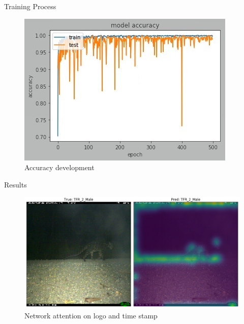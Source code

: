 \documentclass[10pt]{beamer}
\begin{document}
\begin{frame}{Training Process}
	\centering
	\begin{figure}
		\includegraphics[width=.9\columnwidth,height=\textheight,keepaspectratio]{images/Pretrain_acc_ResNet50_cropped_heavy_augment_lr0_0001.jpg}
		\caption{Accuracy development}
	\end{figure}
\end{frame}



\begin{frame}{Results}
	\begin{figure}
		\includegraphics[width=\columnwidth]{images/Attention_Leo_Stamp2.png}
		\caption{Network attention on logo and time stamp}
	\end{figure}
\end{frame}
\end{document}
